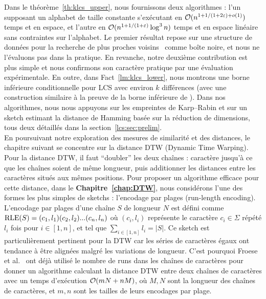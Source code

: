 Dans le théorème~\ref{th:klcs_upper}, nous fournissons deux algorithmes : l'un supposant un alphabet de taille constante s'exécutant en $\mathcal{O}(n^{1+ 1/(1+2\varepsilon) + o(1)})$ temps et en espace, et l'autre en $\mathcal{O}(n^{1+1/(1+\varepsilon)} \log^3 n)$ temps et en espace linéaire sans contraintes sur l'alphabet. Le premier résultat repose sur une structure de données pour la recherche de plus proches voisins~\cite{DBLP:conf/stoc/AndoniR15} comme boîte noire, et nous ne l'évaluons pas dans la pratique. En revanche, notre deuxième contribution est plus simple et nous confirmons son caractère pratique par une évaluation expérimentale.
En outre, dans Fact~\ref{lm:klcs_lower}, nous montrons une borne inférieure conditionnelle pour LCS avec environ $k$ différences (avec une construction similaire à la preuve de la borne inférieure de \kLCS ).
Dans nos algorithmes, nous nous appuyons sur les empreintes de Karp--Rabin et sur un sketch estimant la distance de Hamming basée sur la réduction de dimensions, tous deux détaillés dans la section~\ref{lcs:sec:prelim}. \\


En poursuivant notre exploration des mesures de similarité et des distances, le chapitre suivant se concentre sur la distance DTW (Dynamic Time Warping).  Pour la distance DTW, il faut ``doubler'' les deux chaînes :  caractère jusqu'à ce que les chaînes soient de même longueur, puis additionner les distances entre les caractères situés aux mêmes positions.
Pour proposer un algorithme efficace pour cette distance, dans le \textbf{Chapitre~\ref{chap:DTW}}, nous considérons l'une des formes les plus simples de sketchs : l'encodage par plages (run-length encoding). L'encodage par plages d'une chaîne $S$ de longueur $N$ est défini comme $\mathrm{RLE}(S)=(c_1,l_1)(c_2,l_2)... (c_n,l_n)$ où $(c_i,l_i)$ représente le caractère $c_i \in \Sigma$ répété $l_i$ fois pour $i \in [1,n]$, et tel que $\sum_{i\in [1,n]} l_i = |S|$.
Ce sketch est particulièrement pertinent pour la DTW car les séries de caractères égaux ont tendance à être alignées malgré les variations de longueur. C'est pourquoi Froese et al.~\cite{DBLP:journals/corr/abs-1903-03003} ont déjà utilisé le nombre de runs dans les chaînes de caractères pour donner un algorithme calculant la distance DTW entre deux chaînes de caractères avec un temps d'exécution $\mathcal{O}(mN+nM)$, où $M,N$ sont la longueur des chaînes de caractères, et $m, n$ sont les tailles de leurs encodages par plage.

